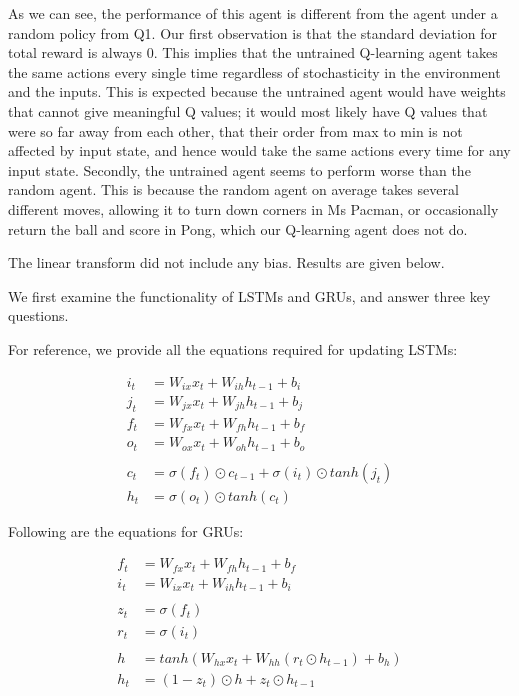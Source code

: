 \documentclass[paper=a4, fontsize=11pt]{scrartcl} %
\numberwithin{equation}{section} %
\numberwithin{figure}{section} %
\numberwithin{table}{section} %
\begin{document}
As we can see, the performance of this agent is different from the agent under a random policy from Q1. Our first observation is that the standard deviation for total reward is always 0. This implies that the untrained Q-learning agent takes the same actions every single time regardless of stochasticity in the environment and the inputs. This is expected because the untrained agent would have weights that cannot give meaningful Q values; it would most likely have Q values that were so far away from each other, that their order from max to min is not affected by input state, and hence would take the same actions every time for any input state. Secondly, the untrained agent seems to perform worse than the random agent. This is because the random agent on average takes several different moves, allowing it to turn down corners in Ms Pacman, or occasionally return the ball and score in Pong, which our Q-learning agent does not do.

The linear transform did not include any bias. Results are given below.



We first examine the functionality of LSTMs and GRUs, and answer three key questions.

For reference, we provide all the equations required for updating LSTMs:

\begin{align}
i_t & = W_{ix}x_t + W_{ih}h_{t-1} + b_i\\
j_t & = W_{jx}x_t + W_{jh}h_{t-1} + b_j\\
f_t & = W_{fx}x_t + W_{fh}h_{t-1} + b_f\\
o_t & = W_{ox}x_t + W_{oh}h_{t-1} + b_o\\
\nonumber \\ 
c_t & = \sigma (f_t) \odot c_{t-1} + \sigma (i_t) \odot	 tanh(j_t)\\
h_t & = \sigma (o_t) \odot tanh(c_t)
\end{align}

Following are the equations for GRUs:

\begin{align}
f_t & = W_{fx}x_t + W_{fh}h_{t-1} + b_f\\
i_t & = W_{ix}x_t + W_{ih}h_{t-1} + b_i\\
\nonumber \\
z_t & = \sigma (f_t)\\
r_t & = \sigma (i_t)\\
\nonumber \\ 
h & = tanh(W_{hx}x_t + W_{hh}(r_t \odot h_{t-1}) + b_h)\\
h_t & = (1-z_t) \odot h + z_t \odot h_{t-1}
\end{align}
\end{document}
